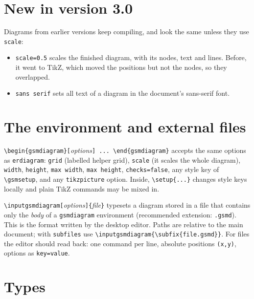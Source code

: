 \documentclass[10pt,a4paper]{article}
\newcommand\cs[1]{\texttt{\textbackslash#1}}
\newcommand\meta[1]{\textlangle\textit{#1}\textrangle}
\begin{document}
\section{New in version 3.0}

Diagrams from earlier versions keep compiling, and look the same unless they use \texttt{scale}:

\begin{itemize}
\item \texttt{scale=0.5} scales the finished diagram, with its nodes, text and lines. Before, it went
  to TikZ, which moved the positions but not the nodes, so they overlapped.
\item \texttt{sans serif} sets all text of a diagram in the document's sans-serif font.
\end{itemize}

\section{The environment and external files}

\verb|\begin{gsmdiagram}[|\meta{options}\verb|] ... \end{gsmdiagram}| accepts the same
options as \texttt{erdiagram}: \texttt{grid} (labelled helper grid),
\texttt{scale} (it scales the whole diagram), \texttt{width}, \texttt{height}, \texttt{max width}, \texttt{max height},
\texttt{checks=false}, any style key of \cs{gsmsetup}, and any
\texttt{tikzpicture} option. Inside, \cs{setup}\verb|{...}| changes style
keys locally and plain TikZ commands may be mixed in.

\verb|\inputgsmdiagram[|\meta{options}\verb|]{|\meta{file}\verb|}| typesets a diagram stored
in a file that contains only the \emph{body} of a \texttt{gsmdiagram}
environment (recommended extension: \texttt{.gsmd}). This is the format
written by the desktop editor. Paths are relative to the main document;
with \texttt{subfiles} use \verb|\inputgsmdiagram{\subfix{file.gsmd}}|.
For files the editor should read back: one command per line, absolute
positions \verb|(x,y)|, options as \texttt{key=value}.

\section{Types}
\end{document}
